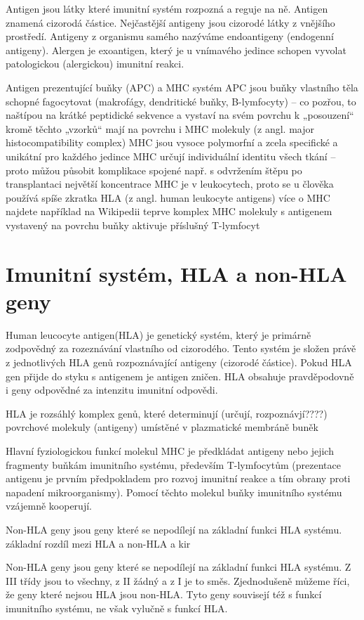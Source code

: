 \documentclass[czech,DP]{thesiskiv}
\begin{document}
Antigen jsou látky které imunitní systém rozpozná a reguje na ně. Antigen znamená cizorodá částice. Nejčastější antigeny jsou cizorodé látky z vnějšího prostředí.
Antigeny z organismu samého nazýváme endoantigeny (endogenní antigeny). Alergen je exoantigen, který je u vnímavého jedince schopen vyvolat patologickou (alergickou) imunitní reakci.

Antigen prezentující buňky (APC) a MHC systém
APC jsou buňky vlastního těla schopné fagocytovat (makrofágy, dendritické buňky, B-lymfocyty) – co pozřou, to naštípou na krátké peptidické sekvence a vystaví na svém povrchu k „posouzení“
kromě těchto „vzorků“ mají na povrchu i MHC molekuly (z angl. major histocompatibility complex)
MHC jsou vysoce polymorfní a zcela specifické a unikátní pro každého jedince
MHC určují individuální identitu všech tkání – proto můžou působit komplikace spojené např. s odvržením štěpu po transplantaci
největší koncentrace MHC je v leukocytech, proto se u člověka používá spíše zkratka HLA (z angl. human leukocyte antigens)
více o MHC najdete například na Wikipedii
teprve komplex MHC molekuly s antigenem vystavený na povrchu buňky aktivuje příslušný T-lymfocyt
\section{Imunitní systém, HLA a non-HLA geny}

Human leucocyte antigen(HLA) je genetický systém, který je primárně zodpovědný za rozeznávání vlastního od cizorodého. Tento systém je složen právě z jednotlivých HLA genů rozpoznávající antigeny (cizorodé částice). Pokud HLA gen přijde do styku s antigenem je antigen zničen.
HLA obsahuje pravděpodovně i geny odpovědné za intenzitu imunitní odpovědi.

HLA je rozsáhlý komplex genů, které determinují (určují, rozpoznávjí????) povrchové molekuly (antigeny) umístěné v plazmatické membráně buněk

Hlavní fyziologickou funkcí molekul MHC je předkládat antigeny nebo jejich fragmenty buňkám imunitního systému, především T-lymfocytům (prezentace antigenu je prvním předpokladem pro rozvoj imunitní reakce a tím obrany proti napadení mikroorganismy). Pomocí těchto molekul buňky imunitního systému vzájemně kooperují.

Non-HLA geny jsou geny které se nepodílejí na základní funkci HLA systému.
\\základní rozdíl mezi HLA a non-HLA a kir

Non-HLA geny jsou geny které se nepodílejí na základní funkci HLA systému. Z III třídy jsou to všechny, z II žádný a z I je to směs. Zjednodušeně můžeme říci, že geny které nejsou HLA jsou non-HLA. Tyto geny souvisejí též s funkcí imunitního systému, ne však vylučně s funkcí HLA. 
\end{document}
